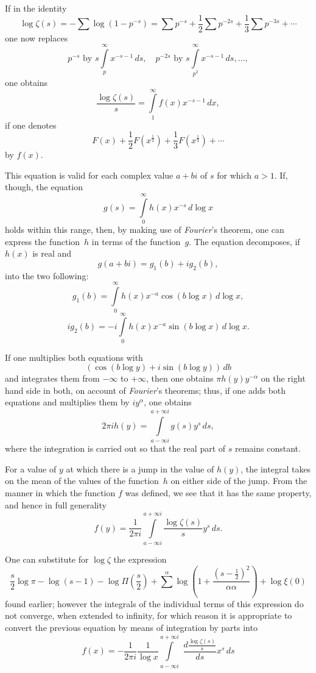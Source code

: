 \documentclass[a4paper,12pt]{article}
\begin{document}
If in the identity
\[ \log \zeta(s) = - {\textstyle\sum} \log (1 - p^{-s})
   = {\textstyle\sum} p^{-s}
     + {\textstyle\frac{1}{2} \sum} p^{-2s}
     + {\textstyle\frac{1}{3} \sum} p^{-3s} + \cdots \]
one now replaces
\[ p^{-s}  \mbox{ by } s\int\limits_p^\infty x^{-s-1}\,ds,\quad
   p^{-2s} \mbox{ by } s\int\limits_{p^2}^\infty x^{-s-1}\,ds,\ldots,\]
one obtains
\[ \frac{\log \zeta(s)}{s}
   = \int\limits_1^\infty f(x) x^{-s-1} \,dx,\]
if one denotes
\[ F(x) + {\textstyle\frac{1}{2}} F(x^{\frac{1}{2}})
        + {\textstyle\frac{1}{3}} F(x^{\frac{1}{3}}) + \cdots \]
by $f(x)$.

This equation is valid for each complex value $a + bi$ of $s$ for
which $a > 1$.  If, though, the equation
\[ g(s) = \int\limits_0^\infty h(x) x^{-s} \,d \log x \]
holds within this range, then, by making use of
\emph{Fourier}'s theorem, one can express the function~$h$ in
terms of the function~$g$.  The equation decomposes, if $h(x)$
is real and
\[ g(a + bi) = g_1(b) + i g_2(b),\]
into the two following:
\[ g_1(b)   =    \int\limits_0^\infty h(x) x^{-a} \cos (b \log x) \,d \log x,\]
\[ i g_2(b) = -i \int\limits_0^\infty h(x) x^{-a} \sin (b \log x) \,d \log x.\]

If one multiplies both equations with
\[ (\cos (b \log y) + i \sin (b \log y)) \,db \]
and integrates them from $-\infty$ to $+\infty$, then one obtains
$\pi h(y) y^{-\alpha}$ on the right hand side in both, on account
of \emph{Fourier}'s theorems; thus, if one adds both equations
and multiplies them by $iy^\alpha$, one obtains
\[ 2\pi i h(y) = \int\limits_{a - \infty i}^{a + \infty i} g(s) y^s \,ds,\]
where the integration is carried out so that the real part
of $s$ remains constant.

For a value of $y$ at which there is a jump in the value of
$h(y)$, the integral takes on the mean of the values of the
function~$h$ on either side of the jump.  From the manner in
which the function $f$ was defined, we see that it has
the same property, and hence in full generality
\[ f(y) = \frac{1}{2\pi i} \int\limits_{a - \infty i}^{a + \infty i}
      \frac{\log \zeta(s)}{s} y^s \,ds.\]

One can substitute for $\log \zeta$ the expression
\[ \frac{s}{2} \log \pi - \log (s - 1)
   - \log \Pi \left( \frac{s}{2} \right)
   + {\textstyle\sum}^\alpha \log \left(
         1 + \frac{(s - \frac{1}{2})^2}{\alpha\alpha} \right)
   + \log \xi(0) \]
found earlier; however the integrals of the individual terms
of this expression do not converge, when extended to infinity,
for which reason it is appropriate to convert the previous equation
by means of integration by parts into
\[ f(x) = - \frac{1}{2\pi i} \frac{1}{\log x}
         \int\limits_{a - \infty i}^{a + \infty i} \, \,
         \frac{\displaystyle d \frac{\log \zeta(s)}{s}}{ds}
         x^s \,ds \]
\end{document}
